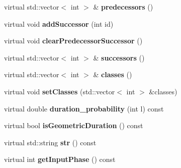 \begin{DoxyCompactItemize}
\mbox{\label{classtops_1_1GHMMState_a5e429753bcdf0bd8c91e9361ba90e735}} 
virtual std\+::vector$<$ int $>$ \& {\bfseries predecessors} ()
\item 
\mbox{\label{classtops_1_1GHMMState_a7662df37573e3b25f9daadd5e3a643db}} 
virtual void {\bfseries add\+Successor} (int id)
\item 
\mbox{\label{classtops_1_1GHMMState_af08bcd3ee8206343f63e99cf78f94164}} 
virtual void {\bfseries clear\+Predecessor\+Successor} ()
\item 
\mbox{\label{classtops_1_1GHMMState_a3da3b418c150ee4eae8d747ea557604c}} 
virtual std\+::vector$<$ int $>$ \& {\bfseries successors} ()
\item 
\mbox{\label{classtops_1_1GHMMState_a538396303b95638b3de6b5a32b5fb644}} 
virtual std\+::vector$<$ int $>$ \& {\bfseries classes} ()
\item 
\mbox{\label{classtops_1_1GHMMState_a258eeab65d4ce831171fb3ef56eff353}} 
virtual void {\bfseries set\+Classes} (std\+::vector$<$ int $>$ \&classes)
\item 
\mbox{\label{classtops_1_1GHMMState_a2fad943358b1b695c4a7499522d61823}} 
virtual double {\bfseries duration\+\_\+probability} (int l) const
\item 
\mbox{\label{classtops_1_1GHMMState_af96504cfe3967a72b85cea606e0988b6}} 
virtual bool {\bfseries is\+Geometric\+Duration} () const
\item 
\mbox{\label{classtops_1_1GHMMState_a7eb198f5d1460825cf3fd59f987a3440}} 
virtual std\+::string {\bfseries str} () const
\item 
\mbox{\label{classtops_1_1GHMMState_aff00289974baefc3dad3ca95b50669ba}} 
virtual int {\bfseries get\+Input\+Phase} () const
\item 
\mbox{\label{classtops_1_1GHMMState_a6bc36d68a563b01db5569a101f1a750a}} 

\end{DoxyCompactItemize}

